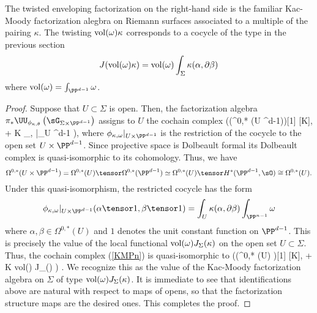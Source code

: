 The twisted enveloping factorization on the right-hand side is the familiar Kac-Moody factorization alegbra on Riemann surfaces associated to a multiple of the pairing $\kappa$.
The twisting ${\rm vol}(\omega) \kappa$ corresponds to a cocycle of the type in the previous section 
\[
J({\rm vol}(\omega) \kappa) = {\rm vol}(\omega) \int_\Sigma \kappa(\alpha, \partial \beta)
\]
where ${\rm vol}(\omega) = \int_{\PP^{d-1}} \omega$. 

\begin{proof}
Suppose that $U \subset \Sigma$ is open. 
Then, the factorization algebra $\pi_* \UU_{\phi_{\kappa, \theta}} \left(\sG_{\Sigma \times \PP^{d-1}}\right)$ assigns to $U$ the cochain complex
\beqn\label{KMPn}
\left(\Sym \left(\Omega^{0,*} (U \times \PP^{d-1})\right)[1] [K], \dbar + K \phi_{\kappa, \omega}|_{U \times \PP^{d-1}} \right),
\eeqn
where $\phi_{\kappa, \omega}|_{U \times \PP^{d-1}}$ is the restriction of the cocycle to the open set $U \times \PP^{d-1}$. 
Since projective space is Dolbeault formal its Dolbeault complex is quasi-isomorphic to its cohomology.
Thus, we have
\[
\Omega^{0,*} (U \times \PP^{d-1}) = \Omega^{0,*}(U) \tensor \Omega^{0,*}(\PP^{d-1}) \simeq \Omega^{0,*}(U) \tensor H^*(\PP^{d-1}, \sO) \cong \Omega^{0,*}(U) .
\]
Under this quasi-isomorphism, the restricted cocycle has the form
\[
\phi_{\kappa,\omega}|_{U \times \PP^{d-1}} (\alpha \tensor 1, \beta \tensor 1) = \int_{U} \kappa(\alpha, \partial \beta) \int_{\PP^{n-1}} \omega 
\]
where $\alpha,\beta \in \Omega^{0,*} (U)$ and $1$ denotes the unit constant function on $\PP^{d-1}$. 
This is precisely the value of the local functional ${\rm vol}(\omega) J_\Sigma (\kappa)$ on the open set $U \subset \Sigma$. 
Thus, the cochain complex (\ref{KMPn}) is quasi-isomorphic to 
\beqn
\left(\Sym \left(\Omega^{0,*} (U) \right)[1] [K], \dbar + K {\rm vol}(\omega) J_\Sigma (\kappa) \right) .
\eeqn
We recognize this as the value of the Kac-Moody factorization algebra on $\Sigma$ of type ${\rm vol}(\omega) J_\Sigma (\kappa)$.
It is immediate to see that identifications above are natural with respect to maps of opens, so that the factorization structure maps are the desired ones. 
This completes the proof.
\end{proof}

